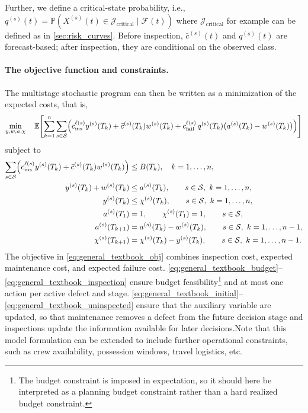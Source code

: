 \documentclass{article}
\begin{document}
Further, we define a critical-state probability, i.e., 
$
q^{(s)}(t) = \mathds P\left(X^{(s)}(t) \in \mathcal J_{\text{critical}} \mid \mathcal F(t) \right)
$ 
where $\mathcal J_{\text{critical}}$ for example can be defined as in \cref{sec:risk_curves}.
Before inspection, $\bar c^{(s)}(t)$ and $q^{(s)}(t)$ are forecast-based; after inspection, they are conditional on the observed class.

\paragraph{The objective function and constraints.}
The multistage stochastic program can then be written as a minimization of the expected costs, that is,
\begin{align}
\min_{y,w,a,\chi}\quad
\mathbb E\!\left[
\sum_{k=1}^n\sum_{s\in\mathcal S}
\Bigl(
c_{\mathrm{ins}}^{\ell(s)} y^{(s)}(T_k)
+ \bar c^{(s)}(T_k) w^{(s)}(T_k)
+ c_{\mathrm{fail}}^{\ell(s)}\,q^{(s)}(T_k)\bigl(a^{(s)}(T_k)-w^{(s)}(T_k)\bigr)
\Bigr)
\right]
\label{eq:general_textbook_obj}
\end{align}
subject to
\begin{align}
\sum_{s\in\mathcal S}
\Bigl(
c^{\ell(s)}_{\mathrm{ins}} y^{(s)} (T_k)
+ \bar c^{(s)}(T_k) w^{(s)}(T_k)
\Bigr)
&\le B(T_k),\quad k = 1,\dots,n,
\label{eq:general_textbook_budget}\\
y^{(s)}(T_k)+w^{(s)}(T_k)
&\le a^{(s)}(T_k),\qquad s\in\mathcal S,\  k = 1,\dots,n,
\label{eq:general_textbook_exclusive}\\
y^{(s)}(T_k)
&\le \chi^{(s)}(T_k),\qquad s\in\mathcal S,\  k = 1,\dots,n,
\label{eq:general_textbook_inspection}\\
a^{(s)}(T_1)&=1,\qquad \chi^{(s)}(T_1)=1, \qquad s\in\mathcal S,
\label{eq:general_textbook_initial}\\
a^{(s)}(T_{k+1})&=a^{(s)}(T_k)-w^{(s)}(T_k),\qquad s\in\mathcal S,\ k=1,\dots,n-1,
\label{eq:general_textbook_activity}\\
\chi^{(s)}(T_{k+1})&=\chi^{(s)}(T_k)-y^{(s)}(T_k),\qquad s\in\mathcal S,\ k=1,\dots,n-1.
\label{eq:general_textbook_uninspected}
\end{align}
The objective in \cref{eq:general_textbook_obj} combines inspection cost, expected maintenance cost, and expected failure cost. 
\cref{eq:general_textbook_budget}--\cref{eq:general_textbook_inspection} ensure budget feasibility\footnote{The budget constraint is imposed in expectation, so it should here be interpreted as a planning budget constraint rather than a hard realized budget constraint.} and at most one action per active defect and stage.
\cref{eq:general_textbook_initial}--\cref{eq:general_textbook_uninspected} ensure that the auxiliary variable are updated, so that maintenance removes a defect from the future decision stage and inspections update the information available for later decisions.Note that this model formulation can be extended to include further operational constraints, such as crew availability, possession windows, travel logistics, etc.
\end{document}
